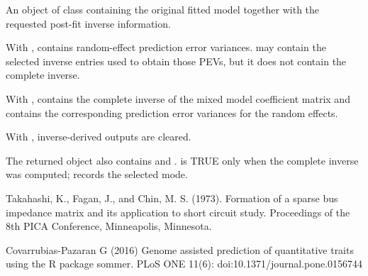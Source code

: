 \documentclass[a4paper]{book}
\begin{document}
\begin{Value}

An object of class  containing the original fitted model together with the requested post-fit inverse information.

With ,  contains random-effect prediction error variances.  may contain the selected inverse entries used to obtain those PEVs, but it does not contain the complete inverse.

With ,  contains the complete inverse of the mixed model coefficient matrix and  contains the corresponding prediction error variances for the random effects.

With , inverse-derived outputs are cleared.

The returned object also contains  and .  is TRUE only when the complete inverse was computed;  records the selected mode.

\end{Value}
%
\begin{References}\relax

Takahashi, K., Fagan, J., and Chin, M. S. (1973). Formation of a sparse bus impedance matrix and its application to short circuit study. Proceedings of the 8th PICA Conference, Minneapolis, Minnesota.

Covarrubias-Pazaran G (2016) Genome assisted prediction of quantitative traits using the R package sommer. PLoS ONE 11(6): doi:10.1371/journal.pone.0156744

\end{References}
%
\begin{Examples}
\end{Examples}
\end{document}
